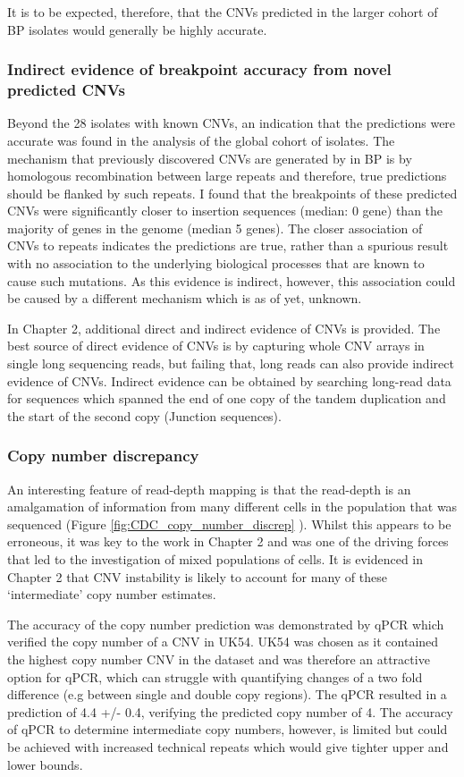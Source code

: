 \documentclass{article}
\begin{document}
It is to be expected, therefore, that the CNVs predicted in the larger cohort of BP isolates would generally be highly accurate.


\subsubsection{Indirect evidence of breakpoint accuracy from novel predicted CNVs}

Beyond the 28 isolates with known CNVs, an indication that the predictions were accurate was found in the analysis of the global cohort of isolates. The mechanism that previously discovered CNVs are generated by in BP is by homologous recombination between large repeats and therefore, true predictions should be flanked by such repeats. I found that the breakpoints of these predicted CNVs were significantly closer to insertion sequences (median: 0 gene) than the majority of genes in the genome (median 5 genes). The closer association of CNVs to repeats indicates the predictions are true, rather than a spurious result with no association to the underlying biological processes that are known to cause such mutations. As this evidence is indirect, however, this association could be caused by a different mechanism which is as of yet, unknown. 

In Chapter 2, additional direct and indirect evidence of CNVs is provided. The best source of direct evidence of CNVs is by capturing whole CNV arrays in single long sequencing reads, but failing that, long reads can also provide indirect evidence of CNVs. Indirect evidence can be obtained by searching long-read data for sequences which spanned the end of one copy of the tandem duplication and the start of the second copy (Junction sequences). 


\subsubsection{Copy number discrepancy}
An interesting feature of read-depth mapping is that the read-depth is an amalgamation of information from many different cells in the population that was sequenced (Figure \ref{fig:CDC_copy_number_discrep} ). Whilst this appears to be erroneous, it was key to the work in Chapter 2 and was one of the driving forces that led to the investigation of mixed populations of cells. It is evidenced in Chapter 2 that CNV instability is likely to account for many of these `intermediate' copy number estimates.

The accuracy of the copy number prediction was demonstrated by qPCR  which verified the copy number of a CNV in UK54. UK54 was chosen as it contained the highest copy number CNV in the dataset and was therefore an attractive option for qPCR, which can struggle with quantifying changes of a two fold difference (e.g between single and double copy regions). The qPCR resulted in a prediction of 4.4 +/- 0.4,  verifying the predicted copy number of 4. The accuracy of qPCR to determine intermediate copy numbers, however, is limited but could be achieved with increased technical repeats which would give tighter upper and lower bounds.
\end{document}
